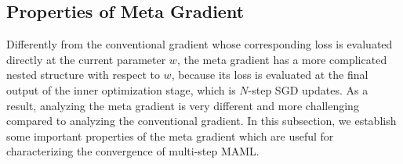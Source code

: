 \documentclass{osudissert96}
\begin{document}
\subsection*{Properties of Meta Gradient}
Differently from the conventional  gradient whose corresponding loss is evaluated directly at the current parameter $w$, the meta  gradient has a more complicated nested structure with respect to $w$, because its loss is evaluated at the final output of the inner optimization stage, which is $N$-step SGD updates.
As a result, analyzing the meta gradient is very different and more challenging compared to analyzing the conventional  gradient. In this subsection, we establish some important properties of the meta gradient which are useful for characterizing the convergence of multi-step MAML.  %

\end{document}
